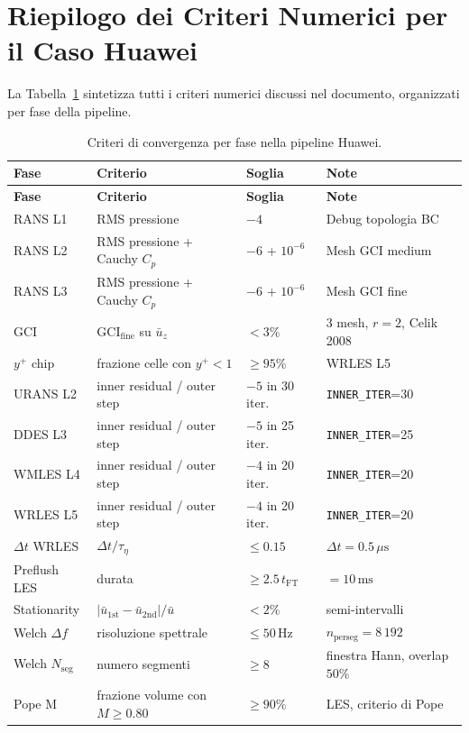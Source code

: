 \documentclass[11pt,a4paper]{article}
\newcommand{\mus}{\,\mu\mathrm{s}}
\providecommand{\ms}{}\renewcommand{\ms}{\,\mathrm{ms}}
\newcommand{\tFT}{t_{\mathrm{FT}}}
\begin{document}
\section{Riepilogo dei Criteri Numerici per il Caso Huawei}
\label{sec:summary}

La Tabella~\ref{tab:summary} sintetizza tutti i criteri numerici
discussi nel documento, organizzati per fase della pipeline.

\begin{longtable}{p{2.0cm}p{4.0cm}p{2.5cm}p{4.5cm}}
  \caption{Criteri di convergenza per fase nella pipeline Huawei.}
  \label{tab:summary} \\
  \toprule
  \rowcolor{tablehead}
  \textbf{Fase} & \textbf{Criterio} & \textbf{Soglia} &
    \textbf{Note} \\
  \midrule
  \endfirsthead
  \toprule
  \rowcolor{tablehead}
  \textbf{Fase} & \textbf{Criterio} & \textbf{Soglia} &
    \textbf{Note} \\
  \midrule
  \endhead
  \bottomrule
  \endfoot
  RANS L1 & RMS pressione & $-4$ & Debug topologia BC \\
  RANS L2 & RMS pressione + Cauchy $C_p$ & $-6$ + $10^{-6}$ &
    Mesh GCI medium \\
  RANS L3 & RMS pressione + Cauchy $C_p$ & $-6$ + $10^{-6}$ &
    Mesh GCI fine \\
  GCI & GCI$_{\mathrm{fine}}$ su $\bar u_z$ & $< 3\%$ &
    3 mesh, $r=2$, Celik 2008 \\
  $y^+$ chip & frazione celle con $y^+<1$ & $\geq 95\%$ &
    WRLES L5 \\
  URANS L2 & inner residual / outer step & $-5$ in 30 iter. &
    \texttt{INNER\_ITER}=30 \\
  DDES L3 & inner residual / outer step & $-5$ in 25 iter. &
    \texttt{INNER\_ITER}=25 \\
  WMLES L4 & inner residual / outer step & $-4$ in 20 iter. &
    \texttt{INNER\_ITER}=20 \\
  WRLES L5 & inner residual / outer step & $-4$ in 20 iter. &
    \texttt{INNER\_ITER}=20 \\
  $\Delta t$ WRLES & $\Delta t / \tau_\eta$ & $\le 0.15$ &
    $\Delta t = 0.5\mus$ \\
  Preflush LES & durata & $\ge 2.5\,\tFT$ & $= 10\ms$ \\
  Stationarity & $|\bar u_{1\mathrm{st}}-\bar u_{2\mathrm{nd}}|/\bar u$ &
    $< 2\%$ & semi-intervalli \\
  Welch $\Delta f$ & risoluzione spettrale & $\le 50$\,Hz &
    $n_{\mathrm{perseg}}=8\,192$ \\
  Welch $N_{\mathrm{seg}}$ & numero segmenti & $\ge 8$ &
    finestra Hann, overlap $50\%$ \\
  Pope M & frazione volume con $M\geq 0.80$ & $\geq 90\%$ &
    LES, criterio di Pope \\
\end{longtable}
\end{document}
